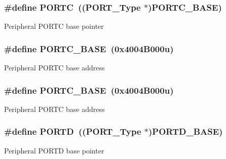 \subsubsection[{\texorpdfstring{P\+O\+R\+TC}{PORTC}}]{\setlength{\rightskip}{0pt plus 5cm}\#define P\+O\+R\+TC~(({\bf P\+O\+R\+T\+\_\+\+Type} $\ast$){\bf P\+O\+R\+T\+C\+\_\+\+B\+A\+SE})}\hypertarget{group__PORT__Peripheral__Access__Layer_ga68fea88642279a70246e026e7221b0a5}{}\label{group__PORT__Peripheral__Access__Layer_ga68fea88642279a70246e026e7221b0a5}
Peripheral P\+O\+R\+TC base pointer 
\subsubsection[{\texorpdfstring{P\+O\+R\+T\+C\+\_\+\+B\+A\+SE}{PORTC_BASE}}]{\setlength{\rightskip}{0pt plus 5cm}\#define P\+O\+R\+T\+C\+\_\+\+B\+A\+SE~(0x4004\+B000u)}\hypertarget{group__PORT__Peripheral__Access__Layer_ga0018f0edf7f8030868f9cc791275378d}{}\label{group__PORT__Peripheral__Access__Layer_ga0018f0edf7f8030868f9cc791275378d}
Peripheral P\+O\+R\+TC base address 
\subsubsection[{\texorpdfstring{P\+O\+R\+T\+C\+\_\+\+B\+A\+SE}{PORTC_BASE}}]{\setlength{\rightskip}{0pt plus 5cm}\#define P\+O\+R\+T\+C\+\_\+\+B\+A\+SE~(0x4004\+B000u)}\hypertarget{group__PORT__Peripheral__Access__Layer_ga0018f0edf7f8030868f9cc791275378d}{}\label{group__PORT__Peripheral__Access__Layer_ga0018f0edf7f8030868f9cc791275378d}
Peripheral P\+O\+R\+TC base address 
\subsubsection[{\texorpdfstring{P\+O\+R\+TD}{PORTD}}]{\setlength{\rightskip}{0pt plus 5cm}\#define P\+O\+R\+TD~(({\bf P\+O\+R\+T\+\_\+\+Type} $\ast$){\bf P\+O\+R\+T\+D\+\_\+\+B\+A\+SE})}\hypertarget{group__PORT__Peripheral__Access__Layer_ga3e6a2517db4f9cb7c9037adf0aefe79b}{}\label{group__PORT__Peripheral__Access__Layer_ga3e6a2517db4f9cb7c9037adf0aefe79b}
Peripheral P\+O\+R\+TD base pointer 
